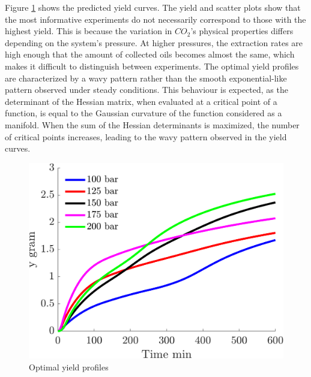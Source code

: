 \documentclass[../Article_Sensitivity_Analsysis.tex]{subfiles}
\begin{document}
	Figure \ref{fig:profiles_y} shows the predicted yield curves. The yield and scatter plots show that the most informative experiments do not necessarily correspond to those with the highest yield. This is because the variation in $CO_2$'s physical properties differs depending on the system's pressure. At higher pressures, the extraction rates are high enough that the amount of collected oils becomes almost the same, which makes it difficult to distinguish between experiments. The optimal yield profiles are characterized by a wavy pattern rather than the smooth exponential-like pattern observed under steady conditions. This behaviour is expected, as the determinant of the Hessian matrix, when evaluated at a critical point of a function, is equal to the Gaussian curvature of the function considered as a manifold. When the sum of the Hessian determinants is maximized, the number of critical points increases, leading to the wavy pattern observed in the yield curves.
	
	\begin{figure}[h!]
		\centering
		\includegraphics[width=\columnwidth]{Figures/Results/yield.png}	
		\caption{Optimal yield profiles}
		\label{fig:profiles_y}
	\end{figure}
	
\end{document}

